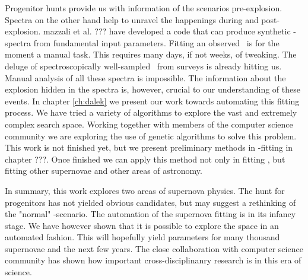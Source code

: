 Progenitor hunts provide us with information of the scenarios pre-explosion. Spectra on the other hand help to unravel the happenings during and post-explosion. mazzali et al. ??? have developed a code that can produce synthetic \snia-spectra from fundamental input parameters. Fitting an observed \snia\ is for the moment a manual task. This requires many days, if not weeks, of tweaking. The deluge of spectroscopically well-sampled \sneia\ from surveys is already hitting us. Manual analysis of all these spectra is impossible. The information about the explosion hidden in the spectra is, however, crucial to our understanding of these events. In chapter \ref{ch:dalek} we present our work towards automating this fitting process. We have tried a variety of algorithms to explore the vast and extremely complex search space. Working together with members of the computer science community we are exploring the use of genetic algorithms to solve this problem. 
This work is not finished yet, but we present preliminary methods in \snia-fitting in chapter ???. Once finished we can apply this method not only in fitting \snia, but fitting other supernovae and other areas of astronomy. 

In summary, this work explores two areas of supernova physics. The hunt for progenitors has not yielded obvious candidates, but may suggest a rethinking of the "normal" \sd-scenario. The automation of the supernova fitting is in its infancy stage. We have however shown that it is possible to explore the space in an automated fashion. This will hopefully yield parameters for many thousand supernovae and the next few years. 
The close collaboration with computer science community has shown how important cross-disciplinanry research is in this era of science. 


